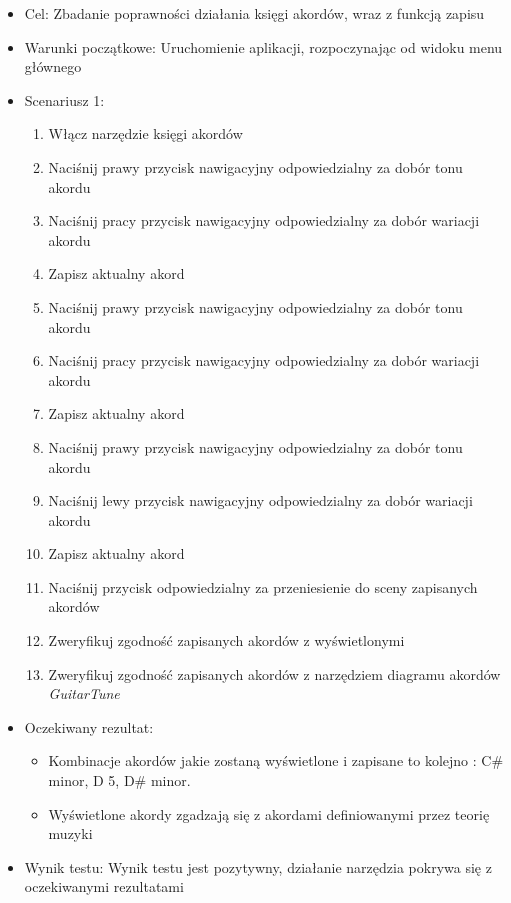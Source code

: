 \begin{itemize}
    \item Cel: Zbadanie poprawności działania księgi akordów, wraz z funkcją zapisu
    \item Warunki początkowe: Uruchomienie aplikacji, rozpoczynając od widoku menu głównego
    \item Scenariusz 1: 
        \begin{enumerate}
            \item Włącz narzędzie księgi akordów
            \item Naciśnij prawy przycisk nawigacyjny odpowiedzialny za dobór tonu akordu
            \item Naciśnij pracy przycisk nawigacyjny odpowiedzialny za dobór wariacji akordu
            \item Zapisz aktualny akord
            \item Naciśnij prawy przycisk nawigacyjny odpowiedzialny za dobór tonu akordu
            \item Naciśnij pracy przycisk nawigacyjny odpowiedzialny za dobór wariacji akordu
            \item Zapisz aktualny akord
            \item Naciśnij prawy przycisk nawigacyjny odpowiedzialny za dobór tonu akordu
            \item Naciśnij lewy przycisk nawigacyjny odpowiedzialny za dobór wariacji akordu
            \item Zapisz aktualny akord
            \item Naciśnij przycisk odpowiedzialny za przeniesienie do sceny zapisanych akordów
            \item Zweryfikuj zgodność zapisanych akordów z wyświetlonymi
            \item Zweryfikuj zgodność zapisanych akordów z narzędziem diagramu akordów \emph{GuitarTune}
        \end{enumerate}
    \item Oczekiwany rezultat: 
        \begin{itemize}
            \item Kombinacje akordów jakie zostaną wyświetlone i zapisane to kolejno : C\# minor, D 5, D\# minor. 
            \item Wyświetlone akordy zgadzają się z akordami definiowanymi przez teorię muzyki
        \end{itemize}
    \item Wynik testu: Wynik testu jest pozytywny, działanie narzędzia pokrywa się z oczekiwanymi rezultatami

\end{itemize}
